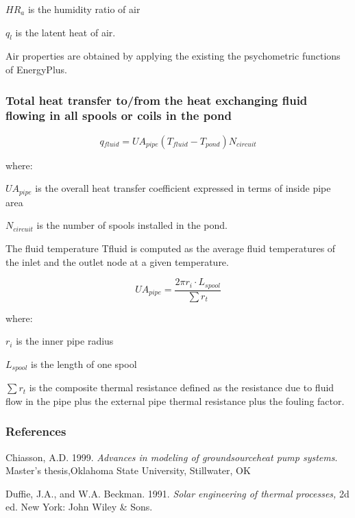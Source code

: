 \(HR_a\) is the humidity ratio of air

\(q_l\) is the latent heat of air.

Air properties are obtained by applying the existing the psychometric functions of EnergyPlus.

\subsubsection{Total heat transfer to/from the heat exchanging fluid flowing in all spools or coils in the pond}\label{total-heat-transfer-tofrom-the-heat-exchanging-fluid-flowing-in-all-spools-or-coils-in-the-pond}

\begin{equation}
q{}_{fluid} = UA{}_{pipe}(T{}_{fluid} - T{}_{pond})N{}_{circuit}
\end{equation}

where:

\(UA{}_{pipe}\) is the overall heat transfer coefficient expressed in terms of inside pipe area

\(N{}_{circuit}\) is the number of spools installed in the pond.

The fluid temperature Tfluid is computed as the average fluid temperatures of the inlet and the outlet node at a given temperature.

\begin{equation}
U{A_{pipe}} = \frac{{2\pi {r_i}\cdot {L_{spool}}}}{{\sum {{r_t}} }}
\end{equation}

where:

\({r_i}\) is the inner pipe radius

\({L_{spool}}\)  is the length of one spool

\(\sum {{r_t}}\) is the composite thermal resistance defined as the resistance due to fluid flow in the pipe plus the external pipe thermal resistance plus the fouling factor.

\subsubsection{References}\label{references-4-002}

Chiasson, A.D. 1999. \emph{Advances in modeling of groundsourceheat pump systems}. Master's thesis,Oklahoma State University, Stillwater, OK

Duffie, J.A., and W.A. Beckman. 1991. \emph{Solar engineering of thermal processes,} 2d ed. New York: John Wiley \& Sons.

